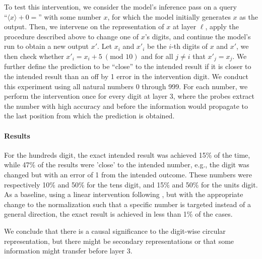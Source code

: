 \documentclass[11pt]{article}
\begin{document}
To test this intervention, we consider the model's inference pass on a query $\text{``}\langle x\rangle + 0=\text{''}$ with some number $x$, for which the model initially generates $x$ as the output. Then, we intervene on the representation of $x$ at layer $\ell$, apply the procedure described above to change one of $x$'s digits, and continue the model's run to obtain a new output $x'$.
Let $x_i$ and $x'_i$ be the $i$-th digits of $x$ and $x'$, we then check whether $x'_i = x_i + 5\ (\text{mod } 10)$ and for all $j\neq i$ that $x'_j=x_j$. 
We further define the prediction to be ``close'' to the intended result if it is closer to the intended result than an off by 1 error in the intervention digit. 
We conduct this experiment using all natural numbers 0 through 999. For each number, we perform the intervention once for every digit at layer 3, where the probes extract the number with high accuracy and before the information would propagate to the last position from which the prediction is obtained.

\paragraph{Results}
For the hundreds digit, the exact intended result was achieved 15\% of the time, while 47\% of the results were 'close' to the intended number, e.g., the digit was changed but with an error of 1 from the intended outcome. These numbers were respectively 10\% and 50\% for the tens digit, and 15\% and 50\% for the units digit.
As a baseline, using a linear intervention following \citet{zhu2024languagemodelsknowvalue}, but with the appropriate change to the normalization such that a specific number is targeted instead of a general direction, the exact result is achieved in less than 1\% of the cases.

We conclude that there is a causal significance to the digit-wise circular representation, but there might be secondary representations or that some information might transfer before layer $3$.
\end{document}
